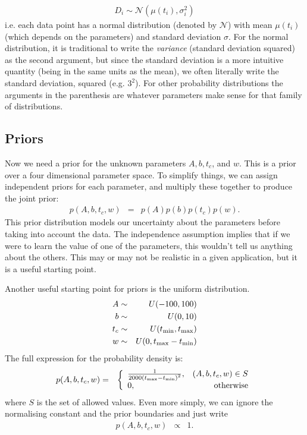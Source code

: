 \begin{eqnarray}
D_i \sim \mathcal{N}\left(\mu(t_i), \sigma_i^2\right)
\end{eqnarray}
i.e. each data point has a normal distribution (denoted by $\mathcal{N}$)
with mean $\mu(t_i)$ (which
depends on the parameters) and standard deviation $\sigma$. For the normal
distribution, it is traditional to write the {\it variance} (standard deviation
squared) as the second argument, but since the standard deviation is a more
intuitive quantity (being in the same units as the mean), we often literally
write the standard deviation, squared (e.g. $3^2$). For other probability
distributions the arguments in the parenthesis are whatever parameters make
sense for that family of distributions.

\subsection{Priors}
Now we need a prior for the unknown parameters $A, b, t_c$, and $w$. This is
a prior over a four dimensional parameter space. To simplify things, we can
assign independent priors for each parameter, and multiply these together
to produce the joint prior:
\begin{eqnarray}
p(A, b, t_c, w) &=& p(A)p(b)p(t_c)p(w).
\end{eqnarray}
This prior distribution models our uncertainty about the parameters before
taking into account the data. The independence assumption implies that if we
were to learn the value of one of the parameters, this wouldn't tell us anything
about the others. This may or may not be realistic in a given application, but
it is a useful starting point.

Another useful starting point for priors is the uniform distribution.
\begin{eqnarray}
A &\sim& U(-100, 100)\\
b &\sim& U(0, 10)\\
t_c &\sim& U(t_{\rm min}, t_{\rm max})\\
w &\sim& U(0, t_{\rm max} - t_{\rm min})
\end{eqnarray}
The full expression for the probability density is:
\begin{eqnarray}
p(A, b, t_c, w) &=&
\left\{
\begin{array}{lr}
\frac{1}{2000\left(t_{\rm max} - t_{\rm min}\right)^2}, & (A, b, t_c, w) \in S\\
0, & \textnormal{otherwise}
\end{array}
\right.
\end{eqnarray}
where $S$ is the set of allowed values. Even more simply, we can ignore the
normalising constant and the prior boundaries and just write
\begin{eqnarray}
p(A, b, t_c, w) &\propto& 1.
\end{eqnarray}




